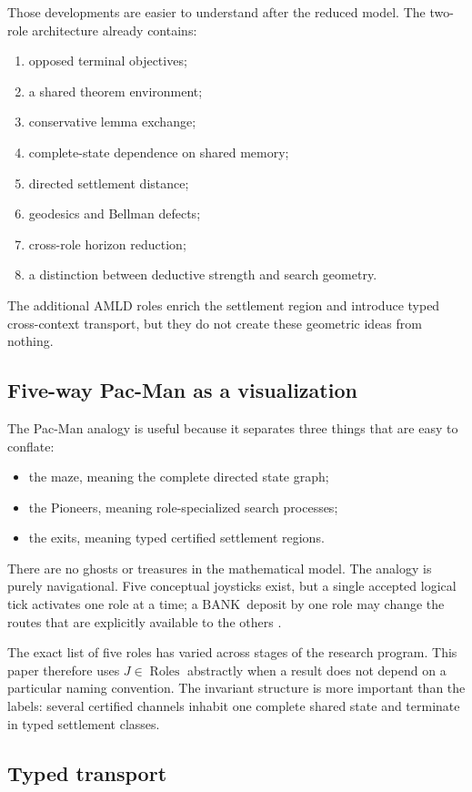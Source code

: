 \documentclass[11pt]{article}
\theoremstyle{remark}
\newcommand{\BANK}{\ensuremath{\mathrm{BANK}}}
\newcommand{\Roles}{\operatorname{Roles}}
\begin{document}
Those developments are easier to understand after the reduced model. The two-role architecture already contains:
\begin{enumerate}
\item opposed terminal objectives;
\item a shared theorem environment;
\item conservative lemma exchange;
\item complete-state dependence on shared memory;
\item directed settlement distance;
\item geodesics and Bellman defects;
\item cross-role horizon reduction;
\item a distinction between deductive strength and search geometry.
\end{enumerate}
The additional AMLD roles enrich the settlement region and introduce typed cross-context transport, but they do not create these geometric ideas from nothing.

\subsection{Five-way Pac-Man as a visualization}

The Pac-Man analogy is useful because it separates three things that are easy to conflate:
\begin{itemize}
\item the maze, meaning the complete directed state graph;
\item the Pioneers, meaning role-specialized search processes;
\item the exits, meaning typed certified settlement regions.
\end{itemize}
There are no ghosts or treasures in the mathematical model. The analogy is purely navigational. Five conceptual joysticks exist, but a single accepted logical tick activates one role at a time; a \BANK\ deposit by one role may change the routes that are explicitly available to the others \cite{TennesonPacMan}.

The exact list of five roles has varied across stages of the research program. This paper therefore uses $J\in\Roles$ abstractly when a result does not depend on a particular naming convention. The invariant structure is more important than the labels: several certified channels inhabit one complete shared state and terminate in typed settlement classes.

\subsection{Typed transport}
\end{document}
